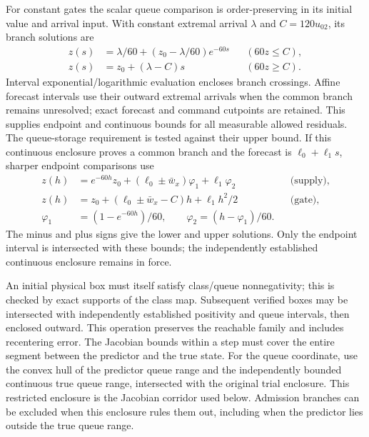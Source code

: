 \documentclass[journal,10pt]{IEEEtran}
\begin{document}
For constant gates the scalar queue comparison is order-preserving in its
initial value and arrival input. With constant extremal arrival $\lambda$
and $C=120u_{02}$, its branch solutions are
\begin{equation}
 \begin{aligned}
 z(s)&=\lambda/60+(z_0-\lambda/60)e^{-60s}
                    &&(60z\le C),\\
 z(s)&=z_0+(\lambda-C)s &&(60z\ge C).
 \end{aligned}
 \label{eq:structure-queue-flows}
\end{equation}
Interval exponential/logarithmic evaluation encloses branch crossings.
Affine forecast intervals use their outward extremal arrivals when the common
branch remains unresolved; exact forecast and command cutpoints are retained.
This supplies endpoint and continuous bounds for all measurable allowed
residuals. The queue-storage requirement is tested against their upper bound.
If this continuous enclosure proves a common branch and the forecast is
$\ell_0+\ell_1s$, sharper endpoint comparisons use
\begin{equation}
\begin{aligned}
 z(h)&=e^{-60h}z_0+(\ell_0\pm\bar w_x)\varphi_1+\ell_1\varphi_2
       &&\text{(supply)},\\
 z(h)&=z_0+(\ell_0\pm\bar w_x-C)h+\ell_1h^2/2
       &&\text{(gate)},\\
 \varphi_1&=(1-e^{-60h})/60,\qquad
 \varphi_2=(h-\varphi_1)/60.
\end{aligned}
\end{equation}
The minus and plus signs give the lower and upper solutions. Only the
endpoint interval is intersected with these bounds; the independently
established continuous enclosure remains in force.

An initial physical box must itself satisfy class/queue nonnegativity; this
is checked by exact supports of the class map. Subsequent verified boxes may
be intersected with independently established positivity and queue intervals,
then enclosed outward. This operation preserves the reachable family and
includes recentering error. The Jacobian bounds within a step must cover the entire segment between
the predictor and the true state. For the queue coordinate, use the convex
hull of the predictor queue range and the independently bounded continuous
true queue range, intersected with the original trial enclosure. This
restricted enclosure is the Jacobian corridor used below. Admission branches
can be excluded when this enclosure rules them out, including when the
predictor lies outside the true queue range.
\end{document}
